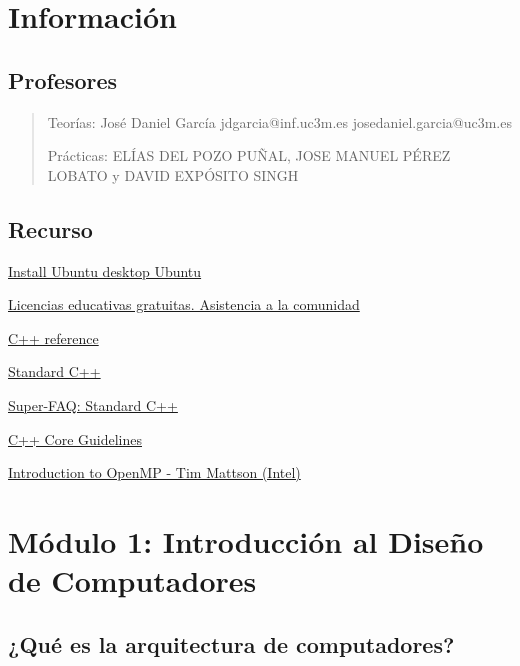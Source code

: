 \documentclass[12pt, twoside, openright]{report} %
\begin{document}
\listoffigures
\thispagestyle{fancy}





\chapter{Información}
\section{Profesores}
\begin{quote}
	Teorías: José Daniel García jdgarcia@inf.uc3m.es
	josedaniel.garcia@uc3m.es

	Prácticas: ELÍAS DEL POZO PUÑAL, JOSE MANUEL
	PÉREZ LOBATO y DAVID EXPÓSITO SINGH
\end{quote}

\section{Recurso}
\href{https://ubuntu.com/tutorials/install-ubuntu-desktop\#1-overview}{Install
	Ubuntu desktop \textbar{} Ubuntu}

\href{https://www.jetbrains.com/es-es/community/education/\#students}{Licencias
	educativas gratuitas. Asistencia a la comunidad}

\href{https://en.cppreference.com/w/cpp}{C++ reference}

\href{https://isocpp.org/}{Standard C++}

\href{https://isocpp.org/faq}{Super-FAQ: Standard C++}

\href{http://isocpp.github.io/CppCoreGuidelines/CppCoreGuidelines}{C++
	Core Guidelines}

\href{https://www.youtube.com/playlist?list=PLLX-Q6B8xqZ8n8bwjGdzBJ25X2utwnoEG}{Introduction
	to OpenMP - Tim Mattson (Intel)}

\chapter{Módulo 1: Introducción al Diseño de Computadores}

\section{¿Qué es la arquitectura de computadores?}
\end{document}
